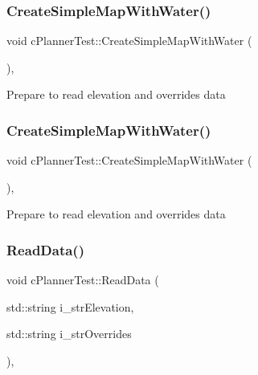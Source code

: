 \subsubsection{\texorpdfstring{Create\+Simple\+Map\+With\+Water()}{CreateSimpleMapWithWater()}\hspace{0.1cm}{\footnotesize\ttfamily [1/2]}}
{\footnotesize\ttfamily void c\+Planner\+Test\+::\+Create\+Simple\+Map\+With\+Water (\begin{DoxyParamCaption}{ }\end{DoxyParamCaption})\hspace{0.3cm}{\ttfamily [inline]}, {\ttfamily [protected]}}

Prepare to read elevation and overrides data \mbox{\label{classc_planner_test_a1e8b184185494cae8444fb7d5f846334}} 
\subsubsection{\texorpdfstring{Create\+Simple\+Map\+With\+Water()}{CreateSimpleMapWithWater()}\hspace{0.1cm}{\footnotesize\ttfamily [2/2]}}
{\footnotesize\ttfamily void c\+Planner\+Test\+::\+Create\+Simple\+Map\+With\+Water (\begin{DoxyParamCaption}{ }\end{DoxyParamCaption})\hspace{0.3cm}{\ttfamily [inline]}, {\ttfamily [protected]}}

Prepare to read elevation and overrides data \mbox{\label{classc_planner_test_af8a0f625c6cb4dffc1ea3182332e53c6}} 
\subsubsection{\texorpdfstring{Read\+Data()}{ReadData()}\hspace{0.1cm}{\footnotesize\ttfamily [1/2]}}
{\footnotesize\ttfamily void c\+Planner\+Test\+::\+Read\+Data (\begin{DoxyParamCaption}\item[{std\+::string}]{i\+\_\+str\+Elevation,  }\item[{std\+::string}]{i\+\_\+str\+Overrides }\end{DoxyParamCaption})\hspace{0.3cm}{\ttfamily [inline]}, {\ttfamily [protected]}}

